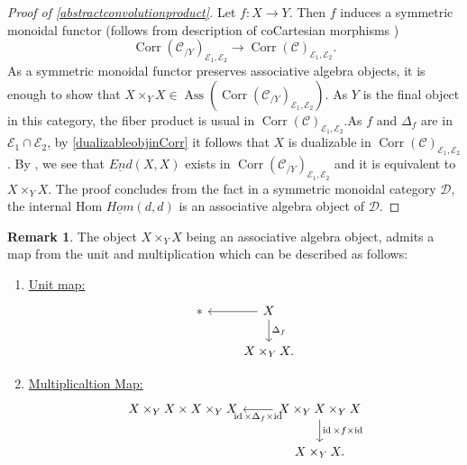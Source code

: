 \documentclass[14pt]{article}
\theoremstyle{definition}
\newtheorem{remark}[theorem]{Remark}
\newcommand{\E}{\mathcal{E}}
\newcommand{\D}{\mathcal{D}}
\newcommand{\op}[1]{\operatorname{#1}}
\newcommand{\Ca}{\mathcal{C}}
\numberwithin{subsection}{section}
\begin{document}
\begin{proof}[Proof of \cref{abstractconvolutionproduct}] Let $f: X \to Y$. Then $f$ induces a symmetric monoidal functor (follows from description of coCartesian morphisms \cite[Lemma 4.1.11]{chowdhury2025sixfunctorformalismsiiiconstruction})
\begin{equation}
    \op{Corr}(\Ca_{/Y})_{\E_1,\E_2} \to \op{Corr}(\Ca)_{\E_1,\E_2}.
\end{equation}
As a symmetric monoidal functor preserves associative algebra objects, it is enough to show that $X \times_Y X \in \op{Ass}(\op{Corr}(\Ca_{/Y})_{\E_1,\E_2})$. As $Y$ is the final object in this category, the fiber product is usual in $\op{Corr}(\Ca)_{\E_1,\E_2}$.As $f$ and $\Delta_f$ are in $\E_1 \cap \E_2$, by \cref{dualizableobjinCorr} it follows that $X$ is dualizable in $\op{Corr}(\Ca)_{\E_1,\E_2}$. By \cite[Lemma B.1.16]{heyer20246functorformalismssmoothrepresentations}, we see that $\underline{End}(X,X)$ exists in $\op{Corr}(\Ca_{/Y})_{\E_1,\E_2}$ and it is equivalent to $X \times_{Y} X$. The proof concludes from the fact in a symmetric monoidal category $\D$, the internal Hom $\underline{Hom}(d,d)$ is an associative algebra object of $\D$.



    
\end{proof}

\begin{remark}
     The object $X \times_Y X$ being an associative algebra object, admits a map from the unit and multiplication which can be described as follows:
   \begin{enumerate}
       \item \underline{Unit map:} \begin{equation}
           \begin{tikzcd}
               * & X \arrow[l]\arrow[d,"\Delta_f"]\\
               {} & X \times_Y X.
           \end{tikzcd}
       \end{equation}
       \item \underline{Multiplicaltion Map:}
       \begin{equation}
           \begin{tikzcd}
               X \times_Y X  \times X \times_Y X & X \times_Y X \times_Y X \arrow[l,"\op{id} \times \Delta_f \times \op{id}"] \arrow[d,"\op{id} \times f \times \op{id}"] \\
               {} & X \times_Y X.
           \end{tikzcd}
       \end{equation}
   \end{enumerate}
\end{remark}
\end{document}
